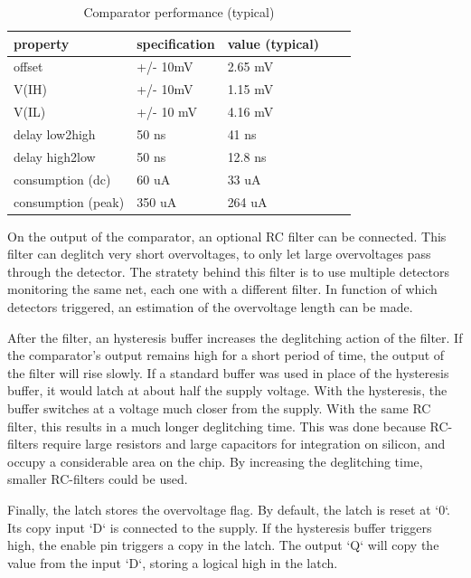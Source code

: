 \begin{table}[!htbp]
\centering
\begin{tabular}{@{}lllll@{}}
\toprule
property           & specification & value (typical) \\
\midrule
offset             & +/- 10mV      & 2.65 mV \\
V(IH)              & +/- 10mV      & 1.15 mV \\
V(IL)              & +/- 10 mV     & 4.16 mV \\
delay low2high     & 50 ns         & 41 ns   \\
delay high2low     & 50 ns         & 12.8 ns \\
consumption (dc)   & 60 uA         & 33 uA \\
consumption (peak) & 350 uA        & 264 uA \\
\bottomrule
\end{tabular}
\caption{Comparator performance (typical)}
\label{tab:comparator-performance}
\end{table}


On the output of the comparator, an optional RC filter can be connected.
This filter can deglitch very short overvoltages, to only let large overvoltages pass through the detector.
The stratety behind this filter is to use multiple detectors monitoring the same net, each one with a different filter.
In function of which detectors triggered, an estimation of the overvoltage length can be made.

After the filter, an hysteresis buffer increases the deglitching action of the filter.
If the comparator's output remains high for a short period of time, the output of the filter will rise slowly.
If a standard buffer was used in place of the hysteresis buffer, it would latch at about half the supply voltage.
With the hysteresis, the buffer switches at a voltage much closer from the supply.
With the same RC filter, this results in a much longer deglitching time.
This was done because RC-filters require large resistors and large capacitors for integration on silicon, and occupy a considerable area on the chip.
By increasing the deglitching time, smaller RC-filters could be used.

Finally, the latch stores the overvoltage flag.
By default, the latch is reset at `0`.
Its copy input `D` is connected to the supply.
If the hysteresis buffer triggers high, the enable pin triggers a copy in the latch.
The output `Q` will copy the value from the input `D`, storing a logical high in the latch.

